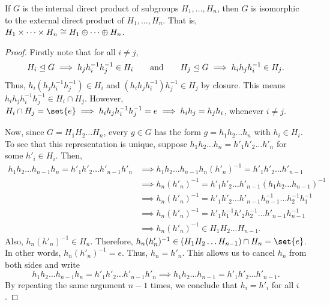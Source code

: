 \documentclass[11pt]{penrose}
\begin{document}
\begin{nthm}
    If $G$ is the internal direct product of subgroups $H_{1}, \dots, H_{n}$, then $G$ is isomorphic to the external direct product of $H_{1}, \dots, H_{n}$. That is, $H_{1} \times \dots \times H_{n} \mathrel{\cong} H_{1} \oplus \dots \oplus H_{n}$.
\end{nthm}
\begin{proof}
    Firstly note that for all $i \neq j$,
    \begin{equation*}
        H_{i} \mathrel{\trianglelefteq} G \implies h_{j} h_{i}^{-1} h_{j}^{-1} \in H_{i}
        \qquad\text{and}\qquad
        H_{j} \mathrel{\trianglelefteq} G \implies h_{i} h_{j} h_{i}^{-1} \in H_{j}.
    \end{equation*}
    Thus, $h_{i} (h_{j} h_{i}^{-1} h_{j}^{-1}) \in H_{i}$ and $(h_{i} h_{j} h_{i}^{-1}) h_{j}^{-1} \in H_{j}$ by closure. This means $h_{i} h_{j} h_{i}^{-1} h_{j}^{-1} \in H_{i} \cap H_{j}$. However, $H_{i} \cap H_{j} = \set{e} \implies h_{i} h_{j} h_{i}^{-1} h_{j}^{-1} = e \implies h_{i} h_{j} = h_{j} h_{i}$, whenever $i \neq j$.

    Now, since $G = H_{1} H_{2} \dots H_{n}$, every $g \in G$ has the form $g = h_{1} h_{2} \dots h_{n}$ with $h_{i} \in H_{i}$. To see that this representation is unique, suppose $h_{1} h_{2} \dots h_{n}  = h'_{1} h'_{2} \dots h'_{n}$ for some $h'_{i} \in H_{i}$. Then,
    \begin{align*}
        h_{1} h_{2} \dots h_{n-1} h_{n}  = h'_{1} h'_{2} \dots h'_{n-1} h'_{n}
        &\implies h_{1} h_{2} \dots h_{n-1} h_{n} (h'_{n})^{-1}  = h'_{1} h'_{2} \dots h'_{n-1}\\
        &\implies h_{n} (h'_{n})^{-1} = h'_{1} h'_{2} \dots h'_{n-1} (h_{1} h_{2} \dots h_{n-1})^{-1}\\
        &\implies h_{n} (h'_{n})^{-1} = h'_{1} h'_{2} \dots h'_{n-1} h_{n-1}^{-1} \dots h_{2}^{-1} h_{1}^{-1}\\
        &\implies h_{n} (h'_{n})^{-1} = h'_{1}h_{1}^{-1} h'_{2}h_{2}^{-1} \dots h'_{n-1}h_{n-1}^{-1}\\
        &\implies h_{n} (h'_{n})^{-1} \in H_{1}H_{2} \dots H_{n-1}.
    \end{align*}
    Also, $h_{n} (h'_{n})^{-1} \in H_{n}$. Therefore, $h_{n} (h'_{n})^{-1} \in (H_{1}H_{2} \dots H_{n-1}) \cap H_{n} = \set{e}$. In other words, $h_{n} (h'_{n})^{-1} = e$. Thus, $h_{n} = h'_{n}$. This allows us to cancel $h_{n}$ from both sides and write
    \begin{equation*}
        h_{1} h_{2} \dots h_{n-1} h_{n}  = h'_{1} h'_{2} \dots h'_{n-1} h'_{n}
        \implies
        h_{1} h_{2} \dots h_{n-1}  = h'_{1} h'_{2} \dots h'_{n-1}.
    \end{equation*}
    By repeating the same argument $n-1$ times, we conclude that $h_{i} = h'_{i}$ for all $i$.


\end{proof}
\end{document}
